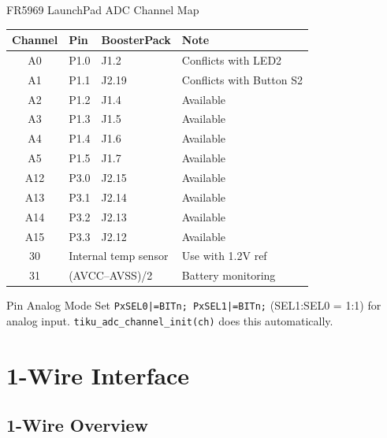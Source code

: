 \documentclass[aspectratio=169, 10pt]{beamer}
\begin{document}
\begin{frame}{FR5969 LaunchPad ADC Channel Map}
\begin{table}
\centering
\small
\begin{tabular}{@{}clll@{}}
\toprule
\textbf{Channel} & \textbf{Pin} & \textbf{BoosterPack} & \textbf{Note} \\
\midrule
A0  & P1.0 & J1.2   & Conflicts with LED2 \\
A1  & P1.1 & J2.19  & Conflicts with Button S2 \\
A2  & P1.2 & J1.4   & Available \\
A3  & P1.3 & J1.5   & Available \\
A4  & P1.4 & J1.6   & Available \\
A5  & P1.5 & J1.7   & Available \\
\midrule
A12 & P3.0 & J2.15  & Available \\
A13 & P3.1 & J2.14  & Available \\
A14 & P3.2 & J2.13  & Available \\
A15 & P3.3 & J2.12  & Available \\
\midrule
30  & \multicolumn{2}{l}{Internal temp sensor} & Use with 1.2V ref \\
31  & \multicolumn{2}{l}{(AVCC--AVSS)/2}       & Battery monitoring \\
\bottomrule
\end{tabular}
\end{table}

\vspace{0.3em}
\begin{alertblock}{Pin Analog Mode}
Set \texttt{PxSEL0|=BITn; PxSEL1|=BITn;} (SEL1:SEL0 = 1:1) for analog input.
\texttt{tiku\_adc\_channel\_init(ch)} does this automatically.
\end{alertblock}
\end{frame}

\section{1-Wire Interface}

\subsection{1-Wire Overview}
\end{document}
